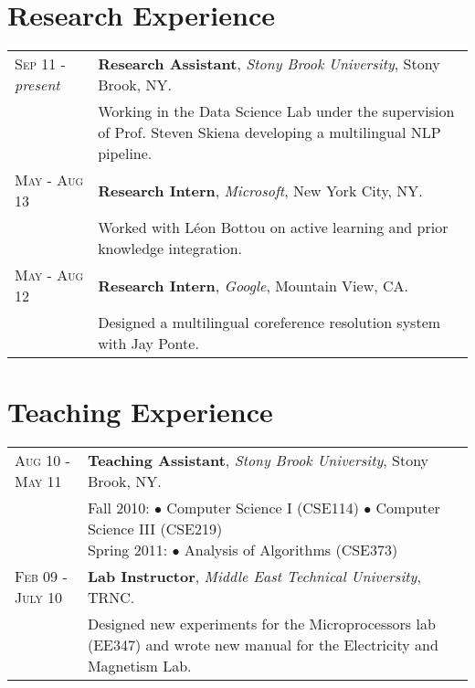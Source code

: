 \documentclass[a4paper, oneside, final]{scrartcl}
\newcommand{\twidthb}{12.65cm}
\newcommand{\twidtha}{3.0cm}
\begin{document}
\section{Research Experience}
\begin{tabular}{p{\twidtha}p{\twidthb}}
\textsc{Sep 11} - \emph{present}  & \textbf{Research Assistant}, \emph{Stony Brook University}, Stony Brook, NY. \\
                    & \footnotesize{\parbox{\twidthb}{Working in the Data
Science Lab under the supervision of Prof. Steven Skiena developing a
multilingual NLP pipeline.}}

\\\textsc{May - Aug 13}  & \textbf{Research Intern}, \emph{Microsoft}, New York City, NY. \\                    
 & \footnotesize{\parbox{\twidthb}{Worked with L\'{e}on Bottou on active learning and prior knowledge integration.}}


\\\textsc{May - Aug 12}  & \textbf{Research Intern}, \emph{Google}, Mountain View, CA. \\                    
 & \footnotesize{\parbox{\twidthb}{Designed a multilingual coreference resolution system with Jay Ponte.}}
\end{tabular}


\section{Teaching Experience}

\begin{tabular}{p{\twidtha}p{\twidthb}}


\\\textsc{Aug 10 - May 11}  & \textbf{Teaching Assistant}, \emph{Stony Brook University}, Stony Brook, NY. \\
                    & \footnotesize{\parbox{\twidthb}{
                        Fall 2010:
                        $\bullet$ Computer Science I (CSE114)
                        $\bullet$ Computer Science III (CSE219)\\
                        Spring 2011: $\bullet$ Analysis of Algorithms (CSE373)}}

\\\textsc{Feb 09 - July 10}  & \textbf{Lab Instructor}, \emph{Middle East Technical University}, TRNC. \\
                    & \footnotesize{\parbox{\twidthb}{
                     Designed new experiments for the Microprocessors lab (EE347) and wrote new manual for the Electricity and Magnetism Lab.}}
\end{tabular}\\
\end{document}
